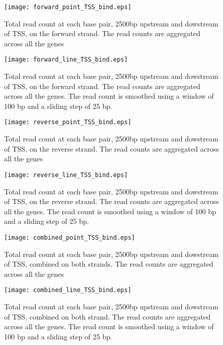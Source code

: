 \documentclass[a4paper,10pt]{article}
\begin{document}
\begin{figure}[!ht]
\centering
\texttt{[image: forward\_point\_TSS\_bind.eps]}
\caption{\small Total read count at each base pair, 2500bp upstream and dowstream of TSS, on the forward strand. The read counts are aggregated across all the genes}
\end{figure}

\begin{figure}[!ht]
\centering
\texttt{[image: forward\_line\_TSS\_bind.eps]}
\caption{\small Total read count at each base pair, 2500bp upstream and dowstream of TSS, on the forward strand. The read counts are aggregated across all the genes. The read count is smoothed using a window of 100 bp and a sliding step of 25 bp.}
\end{figure}

\begin{figure}[!ht]
\centering
\texttt{[image: reverse\_point\_TSS\_bind.eps]}
\caption{\small Total read count at each base pair, 2500bp upstream and dowstream of TSS, on the reverse strand. The read counts are aggregated across all the genes}
\end{figure}

\begin{figure}[!ht]
\centering
\texttt{[image: reverse\_line\_TSS\_bind.eps]}
\caption{\small Total read count at each base pair, 2500bp upstream and dowstream of TSS, on the reverse strand. The read counts are aggregated across all the genes. The read count is smoothed using a window of 100 bp and a sliding step of 25 bp.}
\end{figure}

\begin{figure}[!ht]
\centering
\texttt{[image: combined\_point\_TSS\_bind.eps]}
\caption{\small Total read count at each base pair, 2500bp upstream and dowstream of TSS, combined on both strands. The read counts are aggregated across all the genes}
\end{figure}

\begin{figure}[!ht]
\centering
\texttt{[image: combined\_line\_TSS\_bind.eps]}
\caption{\small Total read count at each base pair, 2500bp upstream and dowstream of TSS, combined on both strand. The read counts are aggregated across all the genes. The read count is smoothed using a window of 100 bp and a sliding step of 25 bp.}
\end{figure}
\end{document}
